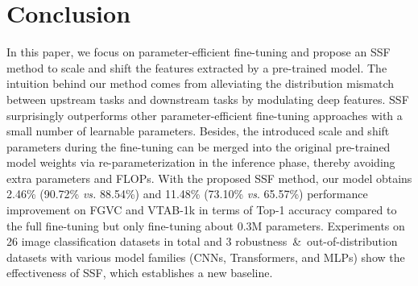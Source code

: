 \section{Conclusion}

In this paper, we focus on parameter-efficient fine-tuning and propose an SSF method to scale and shift the features extracted by a pre-trained model. The intuition behind our method comes from alleviating the distribution mismatch between upstream tasks and downstream tasks by modulating deep features. SSF surprisingly outperforms other parameter-efficient fine-tuning approaches with a small number of learnable parameters. Besides, the introduced scale and shift parameters during the fine-tuning can be merged into the original pre-trained model weights via re-parameterization in the inference phase, thereby avoiding extra parameters and FLOPs. With the proposed SSF method, our model obtains 2.46\% (90.72\% \emph{vs.} 88.54\%) and 11.48\% (73.10\% \emph{vs}. 65.57\%) performance improvement on FGVC and VTAB-1k in terms of Top-1 accuracy compared to the full fine-tuning but only fine-tuning about 0.3M parameters. Experiments on 26 image classification datasets in total and 3 robustness~\&~out-of-distribution datasets with various model families (CNNs, Transformers, and MLPs) show the effectiveness of SSF, which establishes a new baseline.  


